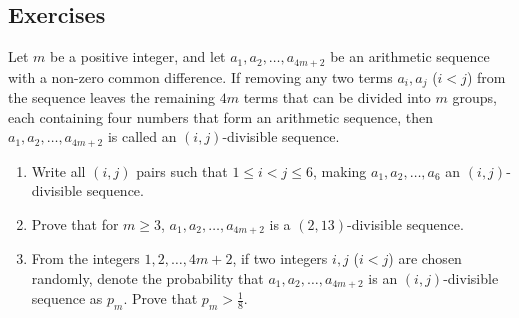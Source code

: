 \subsection{Exercises}
\begin{exercise}
    Let $m$ be a positive integer, and let $a_1, a_2, \ldots, a_{4m+2}$ be an arithmetic sequence with a non-zero common difference. If removing any two terms $a_i, a_j$ ($i < j$) from the sequence leaves the remaining $4m$ terms that can be divided into $m$ groups, each containing four numbers that form an arithmetic sequence, then $a_1, a_2, \ldots, a_{4m+2}$ is called an \((i,j)\)-divisible sequence.

\begin{enumerate}
    \item Write all \((i,j)\) pairs such that $1 \le i < j \le 6$, making $a_1, a_2, \ldots, a_6$ an \((i,j)\)-divisible sequence.
    \item Prove that for $m \ge 3$, $a_1, a_2, \ldots, a_{4m+2}$ is a \((2, 13)\)-divisible sequence.
    \item From the integers $1, 2, \ldots, 4m+2$, if two integers $i, j$ ($i < j$) are chosen randomly, denote the probability that $a_1, a_2, \ldots, a_{4m+2}$ is an \((i,j)\)-divisible sequence as $p_m$. Prove that $p_m > \frac{1}{8}$.
\end{enumerate}
\end{exercise}
